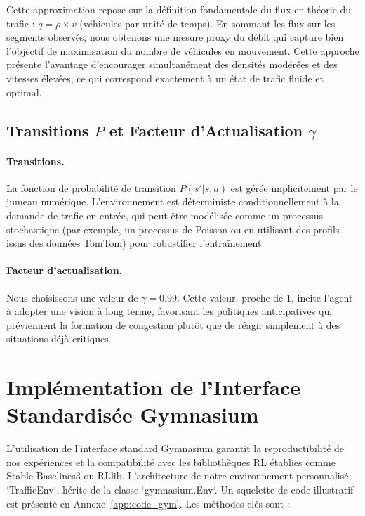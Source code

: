 Cette approximation repose sur la définition fondamentale du flux en théorie du trafic : $q = \rho \times v$ (véhicules par unité de temps). En sommant les flux sur les segments observés, nous obtenons une mesure proxy du débit qui capture bien l'objectif de maximisation du nombre de véhicules en mouvement. Cette approche présente l'avantage d'encourager simultanément des densités modérées et des vitesses élevées, ce qui correspond exactement à un état de trafic fluide et optimal.

\subsection{Transitions $P$ et Facteur d'Actualisation $\gamma$}
\label{subsec:transitions_gamma}

\paragraph{Transitions.} La fonction de probabilité de transition $P(s'|s,a)$ est gérée implicitement par le jumeau numérique. L'environnement est déterministe conditionnellement à la demande de trafic en entrée, qui peut être modélisée comme un processus stochastique (par exemple, un processus de Poisson ou en utilisant des profils issus des données TomTom) pour robustifier l'entraînement.

\paragraph{Facteur d'actualisation.} Nous choisissons une valeur de $\gamma = 0.99$. Cette valeur, proche de 1, incite l'agent à adopter une vision à long terme, favorisant les politiques anticipatives qui préviennent la formation de congestion plutôt que de réagir simplement à des situations déjà critiques.

\section{Implémentation de l'Interface Standardisée Gymnasium}
\label{sec:implementation_gym}

L'utilisation de l'interface standard Gymnasium \parencite{Gymnasium:2023} garantit la reproductibilité de nos expériences et la compatibilité avec les bibliothèques RL établies comme Stable-Baselines3 ou RLlib. L'architecture de notre environnement personnalisé, `TrafficEnv`, hérite de la classe `gymnasium.Env`. Un squelette de code illustratif est présenté en Annexe~\ref{app:code_gym}. Les méthodes clés sont :

